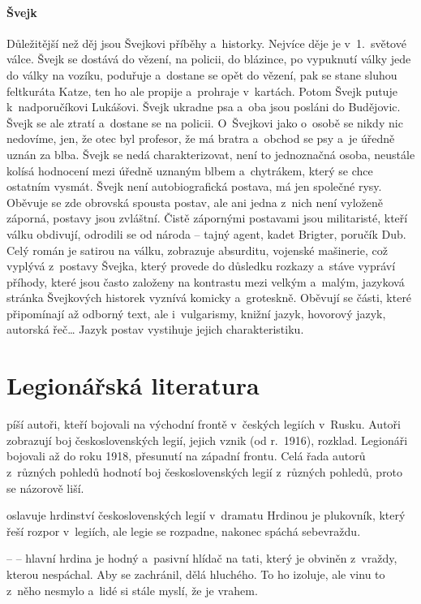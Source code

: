 \paragraph{Švejk}
Důležitější než děj jsou Švejkovi příběhy a~historky. Nejvíce děje je
v~1.~světové válce. Švejk se dostává do vězení, na policii, do blázince,
po vypuknutí války jede do války na vozíku, poduřuje a~dostane se opět
do vězení, pak se stane sluhou feltkuráta Katze, ten ho ale propije
a~prohraje v~kartách. Potom Švejk putuje k~nadporučíkovi Lukášovi. Švejk
ukradne psa a~oba jsou posláni  do Budějovic. Švejk se ale ztratí
a~dostane se na policii. O~Švejkovi jako o~osobě se nikdy nic nedovíme,
jen, že otec byl  profesor, že má bratra a~obchod se psy a~je úředně
uznán za blba. Švejk se nedá charakterizovat, není to jednoznačná osoba,
neustále kolísá hodnocení mezi úředně uznaným blbem a~chytrákem, který
se chce ostatním vysmát.  Švejk není autobiografická postava, má jen
společné rysy. Oběvuje se zde obrovská spousta postav, ale ani jedna
z~nich není vyloženě záporná, postavy jsou zvláštní. Čistě zápornými
postavami  jsou militaristé, kteří válku obdivují, odrodili se od národa
-- tajný agent, kadet Brigter, poručík Dub. Celý román je satirou na
válku, zobrazuje absurditu, vojenské mašinerie, což vyplývá z~postavy
Švejka, který provede do důsledku rozkazy a~stáve vypráví příhody, které
jsou často založeny na kontrastu mezi velkým a~malým, jazyková stránka
Švejkových historek vyznívá komicky a~groteskně. Oběvují se části, které
připomínají až odborný text, ale i~vulgarismy, knižní jazyk, hovorový
jazyk, autorská řeč\dots{} Jazyk postav vystihuje jejich
charakteristiku.

\section{Legionářská literatura}
 píší autoři, kteří bojovali na východní
frontě v~českých legiích v~Rusku. Autoři zobrazují boj československých
legií, jejich vznik (od r.~1916), rozklad. Legionáři bojovali až do roku
1918, přesunutí na západní frontu.  Celá řada autorů z~různých pohledů
hodnotí boj československých legií z~různých pohledů, proto se názorově
liší.

 oslavuje hrdinství československých legií v~dramatu
 Hrdinou je plukovník, který řeší rozpor v~legiích,
ale legie se rozpadne, nakonec spáchá sebevraždu.

\delic

 --  -- hlavní hrdina je hodný
a~pasivní hlídač na tati, který je obviněn z~vraždy, kterou nespáchal. Aby
se zachránil, dělá hluchého. To ho izoluje, ale vinu to z~něho nesmylo
a~lidé si stále myslí, že je vrahem.

